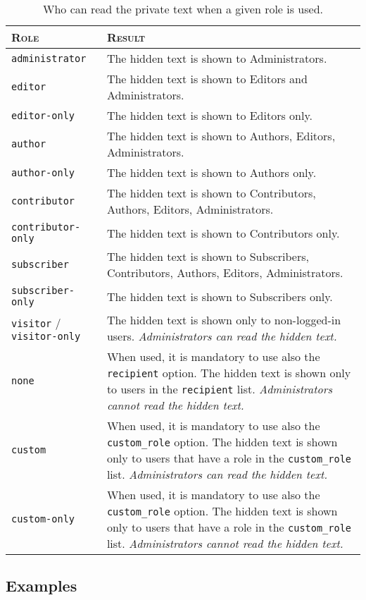 \begin{table}
 \centering
 \begin{tabular}[t]{l p{7cm}}
 \toprule
 \textsc{Role} & \textsc{Result} \\
 \midrule
 \verb+administrator+ & The hidden text is shown to Administrators. \\
 \verb+editor+ & The hidden text is shown to Editors and Administrators. \\
 \verb+editor-only+ & The hidden text is shown to Editors only. \\
 \verb+author+ & The hidden text is shown to Authors, Editors, Administrators.
 \\
 \verb+author-only+ & The hidden text is shown to Authors only. \\
 \verb+contributor+ & The hidden text is shown to Contributors, Authors,
 Editors, Administrators. \\
 \verb+contributor-only+ & The hidden text is shown to Contributors only. \\
 \verb+subscriber+ & The hidden text is shown to Subscribers, Contributors,
 Authors, Editors, Administrators. \\
 \verb+subscriber-only+ & The hidden text is shown to Subscribers only. \\
 \verb+visitor+ / \verb+visitor-only+ & The hidden text is shown only to
 non-logged-in users. \textit{Administrators can read the hidden text.} \\
 \verb+none+ & When used, it is mandatory to use also the \verb+recipient+
 option. The hidden text is shown only to users in the \verb+recipient+ list.
 \textit{Administrators cannot read the hidden text.} \\
 \verb+custom+ & When used, it is mandatory to use also the \verb+custom_role+
 option. The hidden text is shown only to users that have a role in the
 \verb+custom_role+ list. \textit{Administrators can read the hidden text.} \\
 \verb+custom-only+ & When used, it is mandatory to use also the
 \verb+custom_role+ option. The hidden text is shown only to users that have a
 role in the \verb+custom_role+ list. \textit{Administrators cannot read the
 hidden text.} \\
 \bottomrule
 \end{tabular}
 \caption{Who can read the private text when a given role is used.}
 \label{table:roles}
\end{table}

\subsection{Examples}

